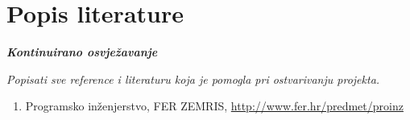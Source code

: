 \chapter*{Popis literature}
	 	
 		\textbf{\textit{Kontinuirano osvježavanje}}
	
		\textit{Popisati sve reference i literaturu koja je pomogla pri ostvarivanju projekta.}
		
		
		\begin{enumerate}
			
			
			\item  Programsko inženjerstvo, FER ZEMRIS, \url{http://www.fer.hr/predmet/proinz}
			
			
			
			
			
		\end{enumerate}
		
		 